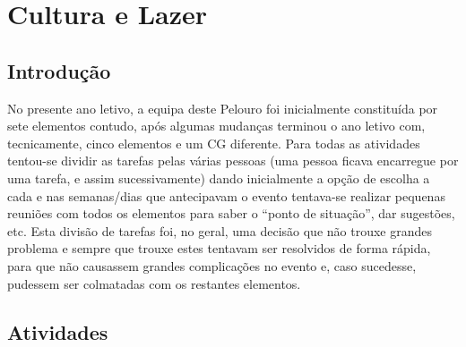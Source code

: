 
\section{Cultura e Lazer}

\subsection{Introdução}

No presente ano letivo, a equipa deste Pelouro foi inicialmente constituída por sete elementos contudo, após algumas mudanças terminou o ano letivo com, tecnicamente, cinco elementos e um CG diferente. Para todas as atividades tentou-se dividir as tarefas pelas várias pessoas (uma pessoa ficava encarregue por uma tarefa, e assim sucessivamente) dando inicialmente a opção de escolha a cada e nas semanas/dias que antecipavam o evento tentava-se realizar pequenas reuniões com todos os elementos para saber o “ponto de situação”, dar sugestões, etc. Esta divisão de tarefas foi, no geral, uma decisão que não trouxe grandes problema e sempre que trouxe estes tentavam ser resolvidos de forma rápida, para que não causassem grandes complicações no evento e, caso sucedesse, pudessem ser colmatadas com os restantes elementos.

\subsection{Atividades}

















